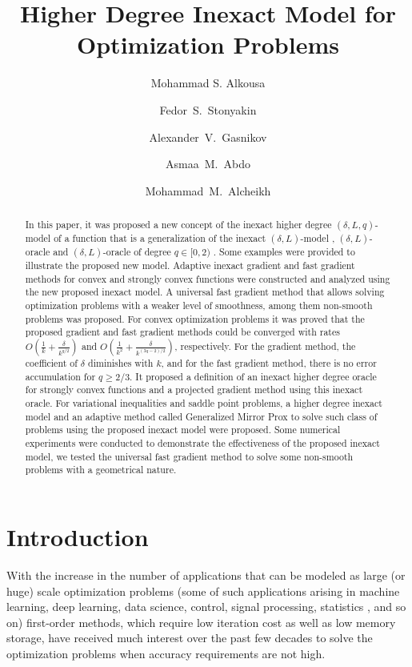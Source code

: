 \documentclass[11pt]{amsart}
\title[Higher degree inexact model] {Higher Degree Inexact Model for Optimization Problems}
\author[M.~Alkousa]{Mohammad S. Alkousa}
\author[F.~Stonyakin]{Fedor~S.~Stonyakin}
\author[A.~Gasnikov]{Alexander~V.~Gasnikov}
\author[A.~Abdo]{Asmaa~M.~Abdo}
\author[M.~Alcheikh]{Mohammad~M.~Alcheikh}
\theoremstyle{definition}
\numberwithin{equation}{section}
\begin{document}
\begin{abstract}
In this paper, it was proposed a new concept of the inexact higher degree $(\delta, L, q)$-model of a function that is a generalization of the inexact $(\delta, L)$-model \cite{Gasnikov2019fast}, $(\delta, L)$-oracle \cite{Devolder2013smooth} and $(\delta, L)$-oracle of degree $q \in [0,2)$ \cite{Nabou2024qoracle}. Some examples were provided to illustrate the proposed new model. Adaptive inexact gradient and fast gradient methods for convex and strongly convex functions were constructed and analyzed using the new proposed inexact model. A universal fast gradient method that allows solving optimization problems with a weaker level of smoothness, among them non-smooth problems was proposed. For convex optimization problems it was proved that the proposed gradient and fast gradient methods could be converged with rates $O\left(\frac{1}{k} + \frac{\delta}{k^{q/2}}\right)$ and $O\left(\frac{1}{k^2} + \frac{\delta}{k^{(3q-2)/2}}\right)$, respectively. For the gradient method, the coefficient of $\delta$ diminishes with $k$, and for the fast gradient method, there is no error accumulation for $q \geq 2/3$. It proposed a definition of an inexact higher degree oracle for strongly convex functions and a projected gradient method using this inexact oracle. For variational inequalities and saddle point problems, a higher degree inexact model and an adaptive method called Generalized Mirror Prox to solve such class of problems using the proposed inexact model were proposed. Some numerical experiments were conducted to demonstrate the effectiveness of the proposed inexact model, we tested the universal fast gradient method to solve some non-smooth problems with a geometrical nature.
\end{abstract}

\maketitle

\section{Introduction} \label{sec:Introduction}

With the increase in the number of applications that can be modeled as large (or huge) scale optimization problems (some of such applications arising in machine learning, deep learning, data science, control, signal processing, statistics \cite{Beck2017,Bottou2018machine}, and so on)  first-order methods, which require low iteration cost as well as low memory storage, have received much interest over the past few decades to solve the optimization problems when accuracy requirements are not high. 
\end{document}
